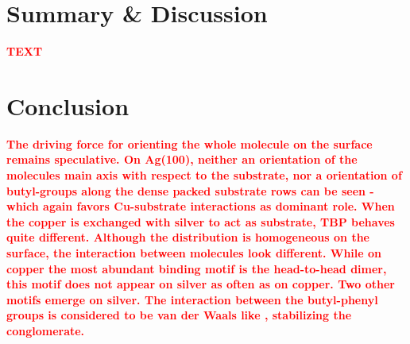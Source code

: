 \section{Summary \& Discussion}
\textcolor{red}{\textbf{TEXT}}
	
\section{Conclusion}
\textcolor{red}{\textbf{
		The driving force for orienting the whole molecule on the surface remains speculative. On Ag(100), neither an orientation of the molecules main axis with respect to the substrate, nor a orientation of butyl-groups along the dense packed substrate rows can be seen - which again favors Cu-substrate interactions as dominant role.
		When the copper is exchanged with silver to act as substrate, TBP behaves quite different. Although the distribution is homogeneous on the surface, the interaction between molecules look different. While on copper the most abundant binding motif is the head-to-head dimer, this motif does not appear on silver as often as on copper. Two other motifs emerge on silver.
		The interaction between the butyl-phenyl groups is considered to be van der Waals like \cite{iacovita_controlling_2012}, stabilizing the conglomerate.
	}}
	
	